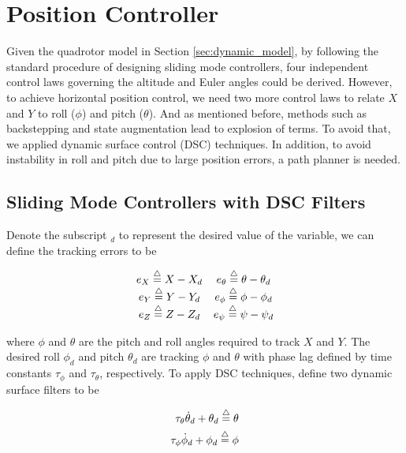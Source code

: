 \documentclass[journal,11pt,onecolumn,draftclsnofoot,]{IEEEtran}
\begin{document}
\section{\textbf{Position Controller}}

Given the quadrotor model in Section \ref{sec:dynamic_model}, by following the standard procedure of designing sliding mode controllers, four independent control laws governing the altitude and Euler angles could be derived. However, to achieve horizontal position control, we need two more control laws to relate $X$ and $Y$ to roll ($\phi$) and pitch ($\theta$). And as mentioned before, methods such as backstepping and state augmentation lead to explosion of terms. To avoid that, we applied dynamic surface control (DSC) techniques. In addition, to avoid instability in roll and pitch due to large position errors, a path planner is needed. 

\subsection{\textbf{Sliding Mode Controllers with DSC Filters}} \label{sliding_controller}

Denote the subscript $_d$ to represent the desired value of the variable, we can define the tracking errors to be

\begingroup\makeatletter{}\check@mathfonts
\begin{equation*}
\begin{split}
\begin{matrix}
e_X \buildrel\triangle\over = X-X_d  & e_\theta \buildrel\triangle\over = \theta - \theta_d \\
e_Y \buildrel\triangle\over = Y-Y_d & e_\phi \buildrel\triangle\over = \phi - \phi_d  \\
e_Z \buildrel\triangle\over = Z-Z_d & e_\psi \buildrel\triangle\over = \psi-\psi_d \\
\end{matrix}
\end{split}
\end{equation*}
\endgroup

where $\phi$ and $\theta$ are the pitch and roll angles required to track $X$ and $Y$. The desired roll $\phi_d$ and pitch $\theta_d$ are tracking $\phi$ and $\theta$ with phase lag defined by time constants $\tau _\phi$ and $\tau _\theta$, respectively. To apply DSC techniques, define two dynamic surface filters to be

\begingroup\makeatletter{}\check@mathfonts
\begin{equation}
\label{eq:1st-order-filters}
\begin{split}
\tau _\theta \dot{\theta}_d+\theta_d \buildrel\triangle\over = \theta \\
\tau _\phi \dot{\phi}_d+\phi_d \buildrel\triangle\over = \phi \\
\end{split}
\end{equation}
\endgroup
\end{document}
